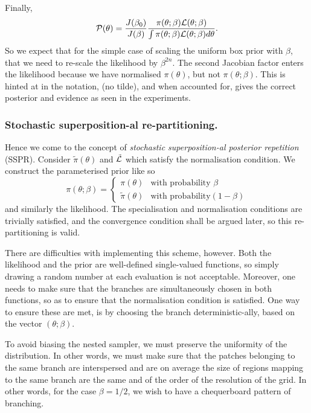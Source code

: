 \documentclass[usenatbib]{mnras}
\begin{document}
Finally, 
\begin{equation}
 {\cal P}(\theta) = \frac{J(\beta_{0})}{J(\beta)} \frac{\pi(\theta; \beta) {\cal L}(\theta; \beta)}{\int \pi(\theta; \beta) {\cal L}(\theta; \beta) d \theta}.
\end{equation}
So we expect that for the simple case of scaling the uniform box
prior with \(\beta\), that we need to re-scale the likelihood by
\(\beta^{2n}\). The second Jacobian factor enters the likelihood because
we have normalised \(\pi(\theta)\), but not \(\pi(\theta; \beta)\). This is hinted at in
the notation, (no tilde), and when accounted for, gives  the correct
posterior and evidence as seen in the experiments. 


\subsubsection{Stochastic superposition-al re-partitioning.}
\label{sec:org8364ce7}

Hence we come to the concept of \emph{stochastic superposition-al
posterior repetition} (SSPR). Consider \(\tilde{\pi}(\theta)\) and
\({\cal \tilde{L}}\) which satisfy the normalisation
condition. We construct the parameterised prior like so
\begin{equation}
  \pi(\theta; \beta)  = \begin{cases}
	\pi(\theta) & \text{with probability } \beta\\
	\tilde{\pi}(\theta) & \text{with probability} (1- \beta)
	\end{cases}
\end{equation}
and similarly the likelihood.  The specialisation and
normalisation conditions are trivially satisfied, and the
convergence condition shall be argued later, so this
re-partitioning is valid.

There are difficulties with implementing this scheme,
however. Both the likelihood and the prior are well-defined
single-valued functions, so simply drawing a random number at each
evaluation is not acceptable. Moreover, one needs to make sure
that the branches are simultaneously chosen in both functions, so
as to ensure that the normalisation condition is satisfied. One
way to ensure these are met, is by choosing the branch
deterministic-ally, based on the vector \((\theta; \beta)\). 

To avoid biasing the nested sampler, we must preserve the
uniformity of the distribution. In other words, we must make sure
that the patches belonging to the same branch are interspersed and
are on average the size of regions mapping to the same branch are
the same and of the order of the resolution of the grid. In other
words, for the case \(\beta=1/2\), we wish to have a chequerboard
pattern of branching. 
\end{document}
